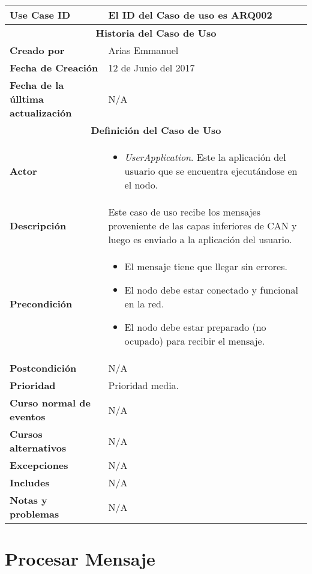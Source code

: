 \begin{longtable}{|p{5cm}|p{8cm}|}
  \hline
  \textbf{Use Case ID} & El ID del Caso de uso es ARQ002 \\ \hline
  \multicolumn{2}{|c|}{\Large\textbf{Historia del Caso de Uso}} \\ \hline
  \textbf{Creado por} & Arias Emmanuel \\ \hline
  \textbf{Fecha de Creación} & 12 de Junio del 2017 \\ \hline
  \textbf{Fecha de la úlltima actualización} & N/A \\ \hline
  \multicolumn{2}{|c|}{\Large\textbf{Definición del Caso de Uso}} \\ \hline
  \textbf{Actor} & \begin{itemize}
    \item \textit{UserApplication}. Este la aplicación del usuario que se encuentra ejecutándose en el nodo.
  \end{itemize} \\ \hline
  \textbf{Descripción} & Este caso de uso recibe los mensajes proveniente de las capas inferiores de CAN
y luego es enviado a la aplicación del usuario. \\ \hline
  \textbf{Precondición} & \begin{itemize}
\item El mensaje tiene que llegar sin errores.
\item El nodo debe estar conectado y funcional en la red.
\item El nodo debe estar preparado (no ocupado) para recibir el mensaje.
\end{itemize} \\ \hline
  \textbf{Postcondición}  & N/A \\ \hline
  \textbf{Prioridad} & Prioridad media. \\ \hline
  \textbf{Curso normal de eventos} & N/A \\ \hline
\textbf{Cursos alternativos} & N/A \\ \hline
\textbf{Excepciones} & N/A \\ \hline
\textbf{Includes} & N/A \\ \hline
\textbf{Notas y problemas} & N/A \\ \hline
\end{longtable}


\section{Procesar Mensaje}

